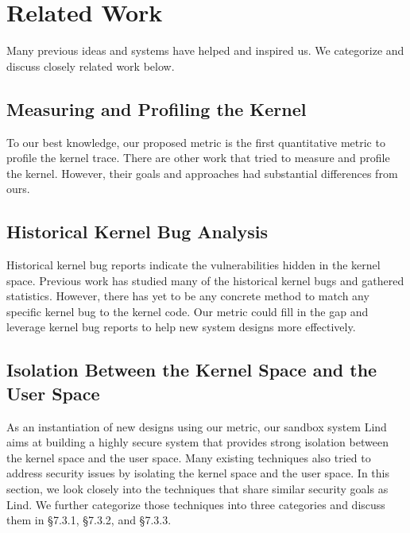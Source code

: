 \section{Related Work}
\label{sec.related_work}

Many previous ideas and systems have helped and inspired us. We categorize and discuss closely related work below.


\subsection{Measuring and Profiling the Kernel}

To our best knowledge, our proposed metric is the first quantitative metric to profile the kernel trace. 
There are other work that tried to measure and profile the kernel. However, their goals and approaches 
had substantial differences from ours.


\subsection{Historical Kernel Bug Analysis}
Historical kernel bug reports indicate the vulnerabilities hidden in the kernel space. 
Previous work has studied many of the historical kernel bugs and gathered statistics. 
However, there has yet to be any concrete method to match any specific kernel bug to the kernel code.  
Our metric could fill in the gap and leverage kernel bug reports to help new system designs more effectively.

\subsection{Isolation Between the Kernel Space and the User Space}

As an instantiation of new designs using our metric, our sandbox system Lind aims at building a highly secure system 
that provides strong isolation between the kernel space and the user space. Many existing techniques also tried to 
address security issues by isolating the kernel space and the user space. In this section, we look closely into the techniques 
that share similar security goals as Lind. We further categorize those techniques into three categories and discuss them 
in \S{7.3.1}, \S{7.3.2}, and \S{7.3.3}. 

